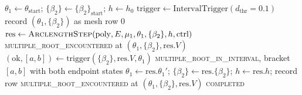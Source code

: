\begin{algorithm}
\caption{\textsc{IntegrateSegment}$(\mathrm{poly},\allowbreak E,\allowbreak \mu_1,\allowbreak \theta_{\mathrm{start}},\allowbreak \{\beta_2\},\allowbreak \theta_{\mathrm{end}},\allowbreak h_0,\allowbreak \mathrm{ctrl},\allowbreak \Delta_{\min})$\\
one curve segment between two multiple roots, with the two MR triggers.}
\label{alg:integrate-segment}
\begin{algorithmic}[1]
\State $\theta_1\gets\theta_{\mathrm{start}}$; $\{\beta_2\}\gets\{\beta_2\}_{\mathrm{start}}$; $h\gets h_0$
\State $\mathrm{trigger}\gets\mathrm{IntervalTrigger}(d_{\mathrm{thr}}=0.1)$ 
\State record $(\theta_1,\{\beta_2\})$ as mesh row 0
  \State $\mathrm{res}\gets\textsc{ArclengthStep}(\mathrm{poly},E,\mu_1,\theta_1,\{\beta_2\},h,\mathrm{ctrl})$
      \State \Return \textsc{multiple\_root\_encountered} at $(\theta_1,\{\beta_2\},\mathrm{res}.V)$ 
    \EndIf
    \State $(\mathrm{ok},[a,b])\gets\mathrm{trigger}(\{\beta_2\},\mathrm{res}.V,\theta_1)$
      \State \Return \textsc{multiple\_root\_in\_interval}, bracket $[a,b]$ with both endpoint states
    \EndIf
    \State $\theta_1\gets\mathrm{res}.\theta_1'$; $\{\beta_2\}\gets\mathrm{res}.\{\beta_2\}$; $h\gets\mathrm{res}.h$; record row
  \Else
    \State \Return \textsc{multiple\_root\_encountered} at $(\theta_1,\{\beta_2\},\mathrm{res}.V)$ 
  \EndIf
\EndWhile
\State \Return \textsc{completed}
\end{algorithmic}
\end{algorithm}

